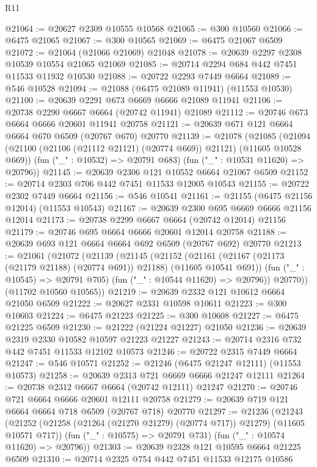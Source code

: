 \begin{lexlean}{R11}
\begin{coremodule}
@21064 := @20627 @2309 @10555 @10568
@21065 := @300 @10560
@21066 := @6475 @21065
@21067 := @300 @10565
@21069 := @6475 @21067 @6509
@21072 := @21064 (@21066 @21069) @21048
@21078 := @20639 @2297 @2308 @10539 @10554 @21065 @21069
@21085 := @20714 @2294 @684 @442 @7451 @11533 @11932 @10530
@21088 := @20722 @2293 @7449 @6664
@21089 := @546 @10528
@21094 := @21088 (@6475 @21089 @11941) (@11553 @10530)
@21100 := @20639 @2291 @673 @6669 @6666 @21089 @11941
@21106 := @20738 @2290 @6667 @6664 (@20742 @11941) @21089
@21112 := @20746 @673 @6664 @6666 @20601 @11941 @20758
@21121 := @20639 @671 @121 @6664 @6664 @670 @6509 (@20767 @670) @20770
@21139 := @21078
    (@21085
      (@21094 (@21100 (@21106 (@21112 @21121) (@20774 @669)) @21121) (@11605 @10528 @669))
      (fun ("_" : @10532) => @20791 @683)
      (fun ("_" : @10531 @11620) => @20796))
@21145 := @20639 @2306 @121 @10552 @6664 @21067 @6509
@21152 := @20714 @2303 @706 @442 @7451 @11533 @12005 @10543
@21155 := @20722 @2302 @7449 @6664
@21156 := @546 @10541
@21161 := @21155 (@6475 @21156 @12014) (@11553 @10543)
@21167 := @20639 @2300 @695 @6669 @6666 @21156 @12014
@21173 := @20738 @2299 @6667 @6664 (@20742 @12014) @21156
@21179 := @20746 @695 @6664 @6666 @20601 @12014 @20758
@21188 := @20639 @693 @121 @6664 @6664 @692 @6509 (@20767 @692) @20770
@21213 := @21061
    (@21072
      (@21139
        (@21145
          (@21152
            (@21161 (@21167 (@21173 (@21179 @21188) (@20774 @691)) @21188) (@11605 @10541 @691))
            (fun ("_" : @10545) => @20791 @705)
            (fun ("_" : @10544 @11620) => @20796))
          @20770))
      (@11702 @10560 @10565))
@21219 := @20639 @2332 @121 @10612 @6664 @21050 @6509
@21222 := @20627 @2331 @10598 @10611
@21223 := @300 @10603
@21224 := @6475 @21223
@21225 := @300 @10608
@21227 := @6475 @21225 @6509
@21230 := @21222 (@21224 @21227) @21050
@21236 := @20639 @2319 @2330 @10582 @10597 @21223 @21227
@21243 := @20714 @2316 @732 @442 @7451 @11533 @12102 @10573
@21246 := @20722 @2315 @7449 @6664
@21247 := @546 @10571
@21252 := @21246 (@6475 @21247 @12111) (@11553 @10573)
@21258 := @20639 @2313 @721 @6669 @6666 @21247 @12111
@21264 := @20738 @2312 @6667 @6664 (@20742 @12111) @21247
@21270 := @20746 @721 @6664 @6666 @20601 @12111 @20758
@21279 := @20639 @719 @121 @6664 @6664 @718 @6509 (@20767 @718) @20770
@21297 := @21236
    (@21243
      (@21252 (@21258 (@21264 (@21270 @21279) (@20774 @717)) @21279) (@11605 @10571 @717))
      (fun ("_" : @10575) => @20791 @731)
      (fun ("_" : @10574 @11620) => @20796))
@21303 := @20639 @2328 @121 @10595 @6664 @21225 @6509
@21310 := @20714 @2325 @754 @442 @7451 @11533 @12175 @10586

\end{coremodule}
\end{lexlean}
